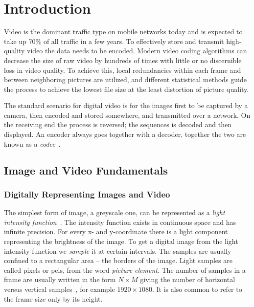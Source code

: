 \chapter{Introduction}

Video is the dominant traffic type on mobile networks today and is expected to take up 70\% of all traffic in a few years. To effectively store and transmit high-quality video the data needs to be encoded. Modern video coding algorithms can decrease the size of raw video by hundreds of times with little or no discernible loss in video quality. To achieve this, local redundancies within each frame and between neighboring pictures are utilized, and different statistical methods guide the process to achieve the lowest file size at the least distortion of picture quality.

The standard scenario for digital video is for the images first to be captured by a camera, then encoded and stored somewhere, and transmitted over a network. On the receiving end the process is reversed; the sequences is decoded and then displayed. An encoder always goes together with a decoder, together the two are known as a \textit{codec}~\cite{Vcodex_Introduction_to_Video_Coding}.


\section{Image and Video Fundamentals}

\subsection{Digitally Representing Images and Video}
The simplest form of image, a greyscale one, can be represented as a \textit{light intensity function}~\cite{Wien_Coding_Tools}. The intensity function exists in continuous space and has infinite precision. For every x- and y-coordinate there is a light component representing the brightness of the image. To get a digital image from the light intensity function we \textit{sample} it at certain intervals. The samples are usually confined to a rectangular area -- the borders of the image. Light samples are called pixels or pels, from the word \textit{picture element}. The number of samples in a frame are usually written in the form $N \times M$ giving the number of horizontal versus vertical samples~\cite{Flierl}, for example $1920 \times 1080$. It is also common to refer to the frame size only by its height.

